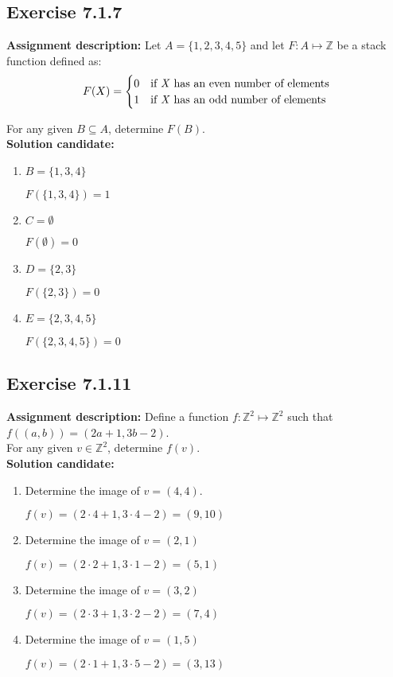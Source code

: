 \documentclass{report}
\newcommand{\cent}[1]{\begin{center}#1\end{center}}
\newcommand{\doubleZ}{\mathbb{Z}}
\newcommand{\In}{\! \in \!}
\newcommand{\AssignmentDescription}{\textbf{Assignment description: }}
\newcommand{\Solution}{\textbf{Solution candidate: }}
\newcommand{\Exercise}[1]{\subsection{Exercise #1}}
\newcommand{\defaultEnumerateLabel}{\textbf{\alph*.}}
\begin{document}
 \Exercise{7.1.7}
 
 \AssignmentDescription
 Let $A=\{1,2,3,4,5\}$ and let $F : A \mapsto \doubleZ$ be a stack function defined as:
 \[ F(X) = 
 \begin{cases}
 	0 &  \text{if \textit{X} has an even number of elements} \\
 	1 &  \text{if \textit{X} has an odd number of elements}
 \end{cases} 
 	\]
 	
 	For any given $B \subseteq A$, determine $F(B)$.\\
 	
 	\Solution
 	\begin{enumerate}[label=\defaultEnumerateLabel]
 		\item $B= \{1,3,4\}$
 		
 		\cent{$F(\{1,3,4\}) = 1$}
 		
 		\item $C = \emptyset$
 		
 		\cent{$F(\emptyset) = 0$}
 		
 		\item $D = \{2,3\}$
 		
 		\cent{$ F(\{2,3\}) = 0 $}
 		
 		\item $E = \{2,3,4,5\}$
 		
 		\cent{$ F(\{2,3,4,5\}) = 0 $}
 	\end{enumerate}
 
 	\Exercise{7.1.11}
 	
 	\AssignmentDescription
 	Define a function $f : \doubleZ^2 \mapsto \doubleZ^2$ such that $f((a,b)) = (2a+1,3b-2)$. \\
 	
 	For any given $v \In \doubleZ^2$, determine $f(v)$.\\
 	
 	\Solution
 	\begin{enumerate}[label=\defaultEnumerateLabel]
 		\item Determine the image of  $v = (4,4)$.
 		
 		\cent{$f(v) = (2\cdot 4 + 1,3 \cdot 4 - 2) = (9,10)$}
 		
 		\item Determine the image of $v = (2,1)$
 		
 		\cent{$f(v) = (2\cdot 2 + 1,3 \cdot 1 - 2) = (5,1)$}
 		
 		\item Determine the image of $v = (3,2)$
 		
 		\cent{$f(v) = (2\cdot 3 + 1,3 \cdot 2 - 2) = (7,4)$}
 		
 		\item Determine the image of $v=(1,5)$
 		
 		\cent{$f(v) = (2\cdot 1 + 1,3 \cdot 5 - 2) = (3,13)$}
 		
 	\end{enumerate}
 
\end{document}
